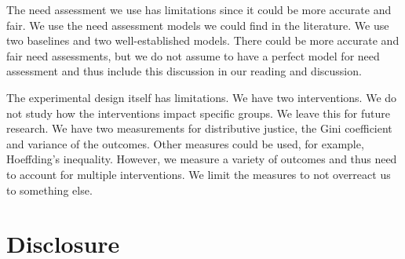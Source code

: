 The need assessment we use has limitations since it could be more accurate and fair. We use the need assessment models we could find in the literature. We use two baselines and two well-established models. There could be more accurate and fair need assessments, but we do not assume to have a perfect model for need assessment and thus include this discussion in our reading and discussion. 

The experimental design itself has limitations. We have two interventions. We do not study how the interventions impact specific groups. We leave this for future research. We have two measurements for distributive justice, the Gini coefficient and variance of the outcomes. Other measures could be used, for example, Hoeffding's inequality. However, we measure a variety of outcomes and thus need to account for multiple interventions. We limit the measures to not overreact us to something else. 
























\section{Disclosure}
